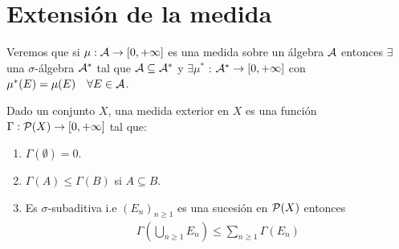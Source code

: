 \section{Extensión de la medida}

Veremos que si $\mu: \mathcal{A} \to [0, +\infty]$ es una medida sobre un álgebra $\mathcal{A}$ entonces $\exists$ una $\sigma$-álgebra
$\mathcal{A}^*$ tal que $\mathcal{A} \subseteq \mathcal{A}^*$ y $\exists \mu^*$ : $\mathcal{A}^* \to [0, +\infty]$ con $\mu^*(E) = \mu(E) \quad \forall E \in \mathcal{A}$.

\begin{definition}
    Dado un conjunto $X$, una medida exterior en $X$ es una función $\Gamma : \mathcal{P}(X) \to [0, +\infty]$ tal que:
    \begin{enumerate}
        \item $\Gamma(\emptyset) = 0$.
        \item $\Gamma(A) \leq \Gamma(B)$ si $A \subseteq B$.
        \item Es $\sigma$-subaditiva i.e $(E_n)_{n \geq 1}$ es una sucesión en $\mathcal{P}(X)$ entonces \begin{align*}
                  \Gamma\left(\bigcup_{n \geq 1} E_n\right) \leq \sum_{n \geq 1} \Gamma(E_n)
              \end{align*}
    \end{enumerate}
\end{definition}

